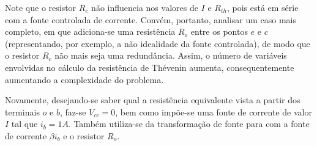 \documentclass{article}
\numberwithin{equation}{section}
\newlength\Colsep
\begin{document}
\noindent Note que o resistor $R_c$ não influencia nos valores de $I$ e $R_{th}$, pois está em série com a fonte controlada de corrente. Convém, portanto, analisar um caso mais completo, em que adiciona-se uma resistência $R_o$ entre os pontos $e$ e $c$ (representando, por exemplo, a não idealidade da fonte controlada), de modo que o resistor $R_c$ não mais seja uma redundância. Assim, o número de variáveis envolvidas no cálculo da resistência de Thévenin aumenta, consequentemente aumentando a complexidade do problema.

\noindent\begin{minipage}{0.95\textwidth}
\begin{minipage}[c][7cm][c]{\dimexpr0.65\textwidth-0.5\Colsep\relax}
    \begin{center}
    \end{center}
\end{minipage} \hfill
\begin{minipage}[c][7cm][c]{\dimexpr0.35\textwidth-0.5\Colsep\relax}
    Novamente, desejando-se saber qual a resistência equivalente vista a partir dos terminais $o$ e $b$, faz-se $V_{cc} = 0$, bem como impõe-se uma fonte de corrente de valor $I$ tal que $i_b = 1A$. Também utiliza-se da transformação de fonte para com a fonte de corrente $\beta i_b$ e o resistor $R_o$.
\end{minipage}
\end{minipage}
\end{document}
